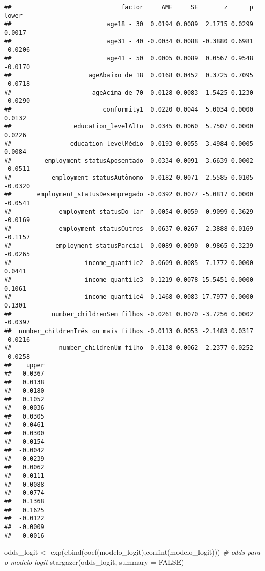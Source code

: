 \documentclass[
]{article}
\newenvironment{Shaded}{\begin{snugshade}}{\end{snugshade}}
\newcommand{\AttributeTok}[1]{\textcolor[rgb]{0.77,0.63,0.00}{#1}}
\newcommand{\CommentTok}[1]{\textcolor[rgb]{0.56,0.35,0.01}{\textit{#1}}}
\newcommand{\ConstantTok}[1]{\textcolor[rgb]{0.00,0.00,0.00}{#1}}
\newcommand{\FunctionTok}[1]{\textcolor[rgb]{0.00,0.00,0.00}{#1}}
\newcommand{\NormalTok}[1]{#1}
\newcommand{\OtherTok}[1]{\textcolor[rgb]{0.56,0.35,0.01}{#1}}
\begin{document}
\begin{verbatim}
##                              factor     AME     SE       z      p   lower
##                          age18 - 30  0.0194 0.0089  2.1715 0.0299  0.0017
##                          age31 - 40 -0.0034 0.0088 -0.3880 0.6981 -0.0206
##                          age41 - 50  0.0005 0.0089  0.0567 0.9548 -0.0170
##                     ageAbaixo de 18  0.0168 0.0452  0.3725 0.7095 -0.0718
##                      ageAcima de 70 -0.0128 0.0083 -1.5425 0.1230 -0.0290
##                         conformity1  0.0220 0.0044  5.0034 0.0000  0.0132
##                 education_levelAlto  0.0345 0.0060  5.7507 0.0000  0.0226
##                education_levelMédio  0.0193 0.0055  3.4984 0.0005  0.0084
##         employment_statusAposentado -0.0334 0.0091 -3.6639 0.0002 -0.0511
##           employment_statusAutônomo -0.0182 0.0071 -2.5585 0.0105 -0.0320
##       employment_statusDesempregado -0.0392 0.0077 -5.0817 0.0000 -0.0541
##             employment_statusDo lar -0.0054 0.0059 -0.9099 0.3629 -0.0169
##             employment_statusOutros -0.0637 0.0267 -2.3888 0.0169 -0.1157
##            employment_statusParcial -0.0089 0.0090 -0.9865 0.3239 -0.0265
##                    income_quantile2  0.0609 0.0085  7.1772 0.0000  0.0441
##                    income_quantile3  0.1219 0.0078 15.5451 0.0000  0.1061
##                    income_quantile4  0.1468 0.0083 17.7977 0.0000  0.1301
##           number_childrenSem filhos -0.0261 0.0070 -3.7256 0.0002 -0.0397
##  number_childrenTrês ou mais filhos -0.0113 0.0053 -2.1483 0.0317 -0.0216
##             number_childrenUm filho -0.0138 0.0062 -2.2377 0.0252 -0.0258
##    upper
##   0.0367
##   0.0138
##   0.0180
##   0.1052
##   0.0036
##   0.0305
##   0.0461
##   0.0300
##  -0.0154
##  -0.0042
##  -0.0239
##   0.0062
##  -0.0111
##   0.0088
##   0.0774
##   0.1368
##   0.1625
##  -0.0122
##  -0.0009
##  -0.0016
\end{verbatim}

\begin{Shaded}
\begin{Highlighting}[]
\NormalTok{odds\_logit }\OtherTok{\textless{}{-}} \FunctionTok{exp}\NormalTok{(}\FunctionTok{cbind}\NormalTok{(}\FunctionTok{coef}\NormalTok{(modelo\_logit),}\FunctionTok{confint}\NormalTok{(modelo\_logit))) }\CommentTok{\# odds para o modelo logit}
\FunctionTok{stargazer}\NormalTok{(odds\_logit, }\AttributeTok{summary =} \ConstantTok{FALSE}\NormalTok{)}
\end{Highlighting}
\end{Shaded}
\end{document}
